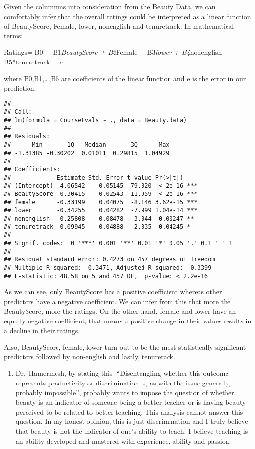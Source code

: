 \documentclass[
]{article}
\providecommand{\tightlist}{%
  \setlength{\itemsep}{0pt}\setlength{\parskip}{0pt}}
\begin{document}
Given the columnms into consideration from the Beauty Data, we can
comfortably infer that the overall ratings could be interpreted as a
linear function of BeautyScore, Female, lower, nonenglish and
tenuretrack. In mathematical terms:

Ratings= B0 + B1\emph{BeautyScore + B2}Female + B3\emph{lower +
B4}nonenglish + B5*tenuretrack + e

where B0,B1,\ldots,B5 are coefficients of the linear function and e is
the error in our prediction.

\begin{verbatim}
## 
## Call:
## lm(formula = CourseEvals ~ ., data = Beauty.data)
## 
## Residuals:
##      Min       1Q   Median       3Q      Max 
## -1.31385 -0.30202  0.01011  0.29815  1.04929 
## 
## Coefficients:
##             Estimate Std. Error t value Pr(>|t|)    
## (Intercept)  4.06542    0.05145  79.020  < 2e-16 ***
## BeautyScore  0.30415    0.02543  11.959  < 2e-16 ***
## female      -0.33199    0.04075  -8.146 3.62e-15 ***
## lower       -0.34255    0.04282  -7.999 1.04e-14 ***
## nonenglish  -0.25808    0.08478  -3.044  0.00247 ** 
## tenuretrack -0.09945    0.04888  -2.035  0.04245 *  
## ---
## Signif. codes:  0 '***' 0.001 '**' 0.01 '*' 0.05 '.' 0.1 ' ' 1
## 
## Residual standard error: 0.4273 on 457 degrees of freedom
## Multiple R-squared:  0.3471, Adjusted R-squared:  0.3399 
## F-statistic: 48.58 on 5 and 457 DF,  p-value: < 2.2e-16
\end{verbatim}

As we can see, only BeautyScore has a positive coefficient whereas other
predictors have a negative coefficient. We can infer from this that more
the BeautyScore, more the ratings. On the other hand, female and lower
have an equally negative coefficient, that means a positive change in
their values results in a decline in their ratings.

Also, BeautyScore, female, lower turn out to be the most statistically
significant predictors followed by non-english and lastly, tenurerack.

\begin{enumerate}
\def\labelenumi{\arabic{enumi}.}
\setcounter{enumi}{1}
\tightlist
\item
  Dr.~Hamermesh, by stating this- ``Disentangling whether this outcome
  represents productivity or discrimination is, as with the issue
  generally, probably impossible'', probably wants to impose the
  question of whether beauty is an indicator of someone being a better
  teacher or is having beauty perceived to be related to better
  teaching. This analysis cannot answer this question. In my honest
  opinion, this is just discrimination and I truly believe that beauty
  is not the indicator of one's ability to teach. I believe teaching is
  an ability developed and mastered with experience, ability and
  passion.
\end{enumerate}
\end{document}
